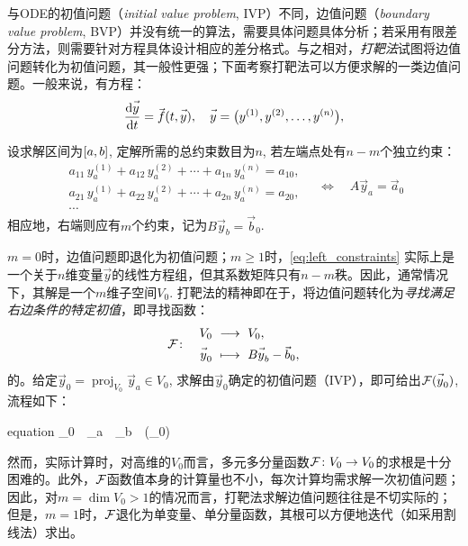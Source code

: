 \documentclass[preview,10pt,border=8pt]{standalone}
\begin{document}
	与ODE的初值问题（\textit{initial value problem}, IVP）不同，边值问题（\textit{boundary value problem}, BVP）并没有统一的算法，需要具体问题具体分析；若采用有限差分方法，则需要针对方程具体设计相应的差分格式。与之相对，\textit{打靶法}试图将边值问题转化为初值问题，其一般性更强；下面考察打靶法可以方便求解的一类边值问题。一般来说，有方程：
	\begin{equation}
		\dv{\vec{y}}{t}
		= \vec{f}(t, \vec{y}),\quad
		\vec{y} = \pqty\big{
			y^{(1)}, y^{(2)}, \dots, y^{(n)}
		},
	\end{equation}
	
	设求解区间为$\bqty{a, b}$, 定解所需的总约束数目为$n$, 若左端点处有$n-m$个独立约束：
	\begin{equation}
	\begin{gathered}
		a_{11}\, y^{(1)}_a + a_{12}\, y^{(2)}_a + \cdots + a_{1n}\, y^{(n)}_a = a_{10}, \\
		a_{21}\, y^{(1)}_a + a_{22}\, y^{(2)}_a + \cdots + a_{2n}\, y^{(n)}_a = a_{20}, \\
		\cdots
	\end{gathered}
	\quad\Longleftrightarrow\quad
		A\vec{y}_a = \vec{a}_0
	\label{eq:left_constraints}
	\end{equation}
	相应地，右端则应有$m$个约束，记为$B\vec{y}_b = \vec{b}_0$. 
	
	$m = 0$时，边值问题即退化为初值问题；$m \ge 1$时，\eqref{eq:left_constraints} 实际上是一个关于$n$维变量$\vec{y}$的线性方程组，但其系数矩阵只有$n-m$秩。因此，通常情况下，其解是一个$m$维子空间$V_0$. 打靶法的精神即在于，将边值问题转化为\textit{寻找满足右边条件的特定初值}，即寻找函数：
	\begin{equation}
	\mcal{F}\colon\quad
	\begin{aligned}
		V_0\ &\longrightarrow\ V_0, \\
		\vec{y}_0\ &\longmapsto\ B\vec{y}_b - \vec{b}_0,
	\end{aligned}
	\end{equation}
	的。给定$\vec{y}_0 = \operatorname{proj}_{V_0} \vec{y}_a \in V_0$, 求解由$\vec{y}_0$确定的初值问题（IVP），即可给出$\mcal{F}(\vec{y}_0)$, 流程如下：
	\begin{empheq}{equation}
		_0\ 
		\  
		_a\ 
		\ 
		_b\ 
		\longmapsto\ 
		(_0)
	\end{empheq}
	
	然而，实际计算时，对高维的$V_0$而言，多元多分量函数$\mathcal{F}\colon V_0\to V_0$的求根是十分困难的。此外，$\mathcal{F}$函数值本身的计算量也不小，每次计算均需求解一次初值问题；因此，对$m = \dim V_0 > 1$的情况而言，打靶法求解边值问题往往是不切实际的；但是，$m = 1$时，$\mathcal{F}$退化为单变量、单分量函数，其根可以方便地迭代（如采用割线法）求出。
	
\end{document}
